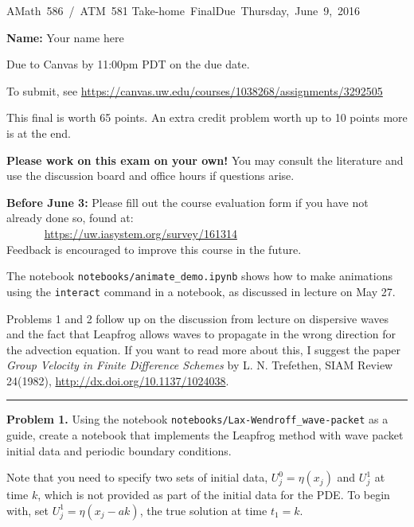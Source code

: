 \documentclass[10pt]{article}
\begin{document}
\hfill\vbox{\hbox{AMath 586 / ATM 581}
\hbox{Take-home Final}\hbox{Due Thursday, June 9, 2016}}

{\bf Name:} Your name here
\vskip 5pt

Due to Canvas by 11:00pm PDT on the due date.

To submit, see
\url{https://canvas.uw.edu/courses/1038268/assignments/3292505}

This final is worth 65 points. An extra credit problem worth up to 10 points
more is at the end.

\vskip 10pt
{\bf Please work on this exam on your own!}  You may consult the literature
and use the discussion board and office hours if questions arise.

\vskip 10pt
{\bf Before June 3:}  
Please fill out the course evaluation form if you have not already done
so, found at:\\
\verb+      + \url{https://uw.iasystem.org/survey/161314}\\
Feedback is encouraged to improve this course in the future.

\vskip 10pt
The notebook  \verb+notebooks/animate_demo.ipynb+ shows how to make
animations using the \verb+interact+ command in a notebook, as discussed in
lecture on May 27.

\vskip 10pt
Problems 1 and 2 follow up on the discussion from lecture on dispersive
waves and the fact that Leapfrog allows waves to propagate in the wrong
direction for the advection equation.  If you want to read more about this,
I suggest the paper {\it Group Velocity in Finite Difference Schemes} by L.
N. Trefethen, SIAM Review 24(1982), \url{http://dx.doi.org/10.1137/1024038}.

\vskip 1cm
\hrule
{\bf Problem 1.}  
Using the notebook \verb+notebooks/Lax-Wendroff_wave-packet+ as a guide,
create a notebook that implements the Leapfrog method with wave packet
initial data and periodic boundary conditions.  

Note that you need to specify two sets of initial data, $U_j^0 = \eta(x_j)$
and $U_j^1$ at time $k$, which is not provided as part of the initial data
for the PDE.  To begin with, set $U_j^1 = \eta(x_j - ak)$, the true solution
at time $t_1 = k$.
\end{document}
